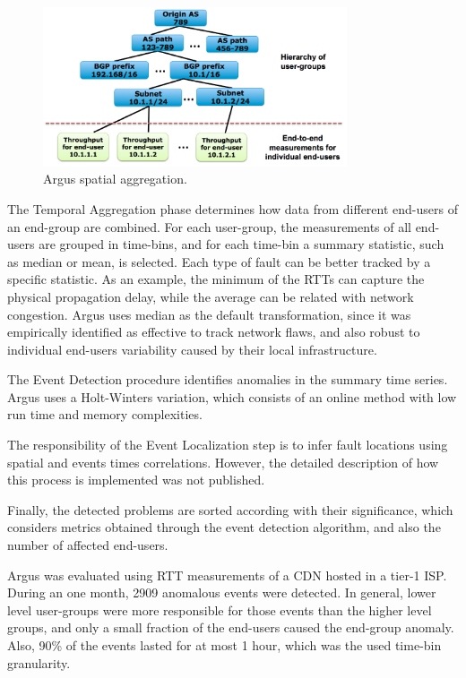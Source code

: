 \begin{figure}[H]
    \centering
    \includegraphics[width=0.8\textwidth]{./figures/literature_review/argus_spatial_aggregation.png}
    \caption{Argus spatial aggregation.~\cite{argus_end_to_end_service_anomaly_detection_and_localization_from_an_isps_point_of_view}}
\label{fig:argus_spatial_aggregation}
\end{figure}%

The Temporal Aggregation phase determines how data
from different end-users of an end-group are combined.
For each user-group, the
measurements of all end-users are grouped in time-bins, and for each
time-bin a summary statistic, such as median or mean, is selected.
Each type of fault can be better tracked by a specific statistic.
As an example, the
minimum of the RTTs can capture the physical propagation delay,
while the average can be related with network congestion. Argus uses median
as the default transformation, since it was empirically identified as
effective to track network flaws, and also robust to individual
end-users variability caused by their local infrastructure.

The Event Detection procedure identifies anomalies in the
summary time series. Argus uses a Holt-Winters variation,  which consists of
an online
method with low run time and memory complexities.

The responsibility of the Event Localization step is to infer fault locations
using spatial and events times correlations.
However, the detailed description of how this
process is implemented was not published.

Finally, the detected problems are sorted according with
their significance, which considers metrics obtained
through the event detection
algorithm, and also the number of affected end-users.

Argus was evaluated using RTT measurements of a CDN hosted in a tier-1 ISP\@.
During an one month, 2909 anomalous events were detected.
In general, lower level user-groups were more responsible
for those events than the higher level groups,
and only a small fraction of the end-users caused the end-group anomaly.
Also, 90\% of the events lasted for
at most 1 hour, which was the used time-bin granularity.

